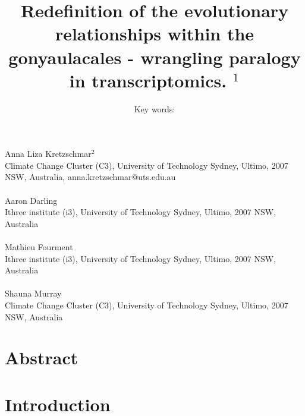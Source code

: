 \documentclass[12pt]{article}
\title{Redefinition of the evolutionary relationships within the gonyaulacales - wrangling paralogy in transcriptomics. $^{1}$}
\author{Key words: }
\date{}
\begin{document}
\maketitle
\paragraph{}Anna Liza Kretzschmar$^{2}$\\
Climate Change Cluster (C3), University of Technology Sydney, Ultimo, 2007 NSW, Australia, anna.kretzschmar@uts.edu.au
\paragraph{}Aaron Darling \\
Ithree institute (i3), University of Technology Sydney, Ultimo, 2007 NSW, Australia
\paragraph{}Mathieu Fourment \\
Ithree institute (i3), University of Technology Sydney, Ultimo, 2007 NSW, Australia
\paragraph{}Shauna Murray\\ 
Climate Change Cluster (C3), University of Technology Sydney, Ultimo, 2007 NSW, Australia
\newpage
\section{Abstract}
\newpage

\section{Introduction}
\end{document}
